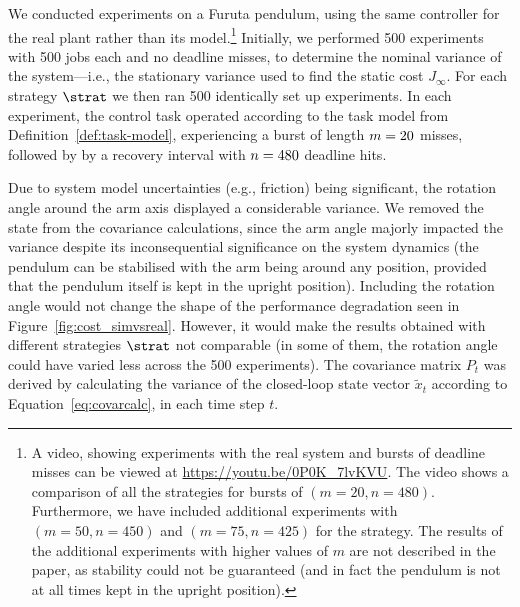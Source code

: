 We conducted experiments on a Furuta pendulum, using the same controller for the real plant rather than its model.\footnote{A video, showing experiments with the real system and bursts of deadline misses can be viewed at \url{https://youtu.be/0P0K_7lvKVU}. The video shows a comparison of all the strategies for bursts of $(m = 20, n=480)$. Furthermore, we have included additional experiments with $(m=50, n=450)$ and $(m=75, n=425)$ for the \tSH{} strategy. The results of the additional experiments with higher values of $m$ are not described in the paper, as stability could not be guaranteed (and in fact the pendulum is not at all times kept in the upright position).}
Initially, we performed 500 experiments with 500 jobs each and no deadline misses, to determine the nominal variance of the system---i.e., the stationary variance used to find the static cost $J_\infty$.
For each strategy $\strat$ we then ran 500 identically set up experiments. 
In each experiment, the control task operated according to the task model from Definition~\ref{def:task-model}, experiencing a burst of length $m=20$ misses, followed by by a recovery interval with $n=480$ deadline hits.

Due to system model uncertainties (e.g., friction) being significant, the rotation angle around the arm axis displayed a considerable variance.
We removed the state from the covariance calculations, since the arm angle majorly impacted the variance despite its inconsequential significance on the system dynamics (the pendulum can be stabilised with the arm being around any position, provided that the pendulum itself is kept in the upright position).
Including the rotation angle would not change the shape of the performance degradation seen in Figure~\ref{fig:cost_simvsreal}. 
However, it would make the results obtained with different strategies $\strat$ not comparable (in some of them, the rotation angle could have varied less across the 500 experiments). 
The covariance matrix $P_t$ was derived by calculating the variance of the closed-loop state vector $\tilde{x}_t$ according to Equation~\eqref{eq:covarcalc}, in each time step $t$. 

